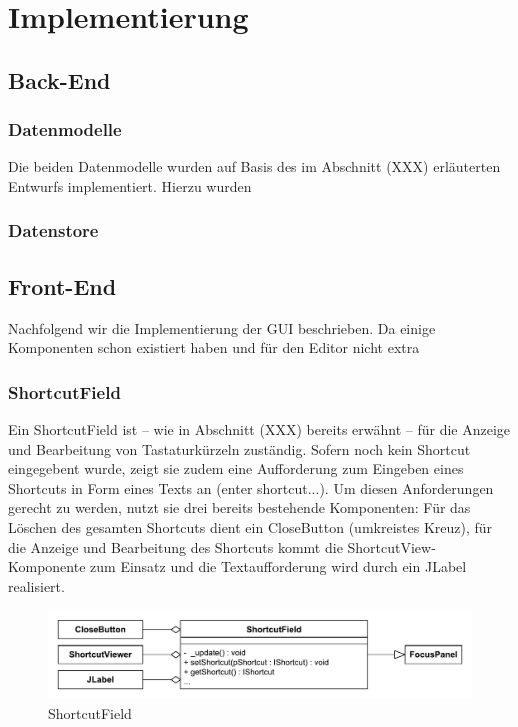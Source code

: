 \section{Implementierung}

\subsection{Back-End}

\subsubsection{Datenmodelle}

Die beiden Datenmodelle wurden auf Basis des im Abschnitt (XXX) erläuterten Entwurfs implementiert. Hierzu wurden 

\subsubsection{Datenstore}

\newpage

\subsection{Front-End}

Nachfolgend wir die Implementierung der GUI beschrieben. Da einige Komponenten schon existiert haben und für den Editor nicht extra

\subsubsection{ShortcutField}

Ein ShortcutField ist -- wie in Abschnitt (XXX) bereits erwähnt -- für die Anzeige und Bearbeitung von Tastaturkürzeln zuständig. Sofern noch kein Shortcut eingegebent wurde, zeigt sie zudem eine Aufforderung zum Eingeben eines Shortcuts in Form eines Texts an (\glqq enter shortcut...\grqq). Um diesen Anforderungen gerecht zu werden, nutzt sie drei bereits bestehende Komponenten: Für das Löschen des gesamten Shortcuts dient ein CloseButton (umkreistes Kreuz), für die Anzeige und Bearbeitung des Shortcuts kommt die ShortcutView-Komponente zum Einsatz und die Textaufforderung wird durch ein JLabel realisiert.

\begin{figure}[H]
	\centering
	\includegraphics[width=0.9\linewidth]{../graphic/diagrams/CD_ShortcutField/ShortcutField}
	\caption{ShortcutField}
	\label{fig:shortcutfield}
\end{figure}

